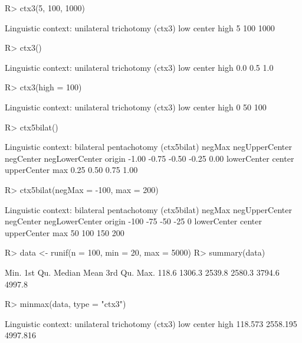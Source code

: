 \documentclass{article}\usepackage[]{graphicx}\usepackage[]{color}
\begin{document}
\begin{Schunk}
% --begin: "ctx"
\begin{Sinput}
R> ctx3(5, 100, 1000)
\end{Sinput}
\begin{Soutput}
Linguistic context: unilateral trichotomy (ctx3)
   low center   high 
     5    100   1000 
\end{Soutput}
\begin{Sinput}
R> ctx3()
\end{Sinput}
\begin{Soutput}
Linguistic context: unilateral trichotomy (ctx3)
   low center   high 
   0.0    0.5    1.0 
\end{Soutput}
\begin{Sinput}
R> ctx3(high = 100)
\end{Sinput}
\begin{Soutput}
Linguistic context: unilateral trichotomy (ctx3)
   low center   high 
     0     50    100 
\end{Soutput}
\begin{Sinput}
R> ctx5bilat()
\end{Sinput}
\begin{Soutput}
Linguistic context: bilateral pentachotomy (ctx5bilat)
        negMax negUpperCenter      negCenter negLowerCenter         origin 
         -1.00          -0.75          -0.50          -0.25           0.00 
   lowerCenter         center    upperCenter            max 
          0.25           0.50           0.75           1.00 
\end{Soutput}
\begin{Sinput}
R> ctx5bilat(negMax = -100, max = 200)
\end{Sinput}
\begin{Soutput}
Linguistic context: bilateral pentachotomy (ctx5bilat)
        negMax negUpperCenter      negCenter negLowerCenter         origin 
          -100            -75            -50            -25              0 
   lowerCenter         center    upperCenter            max 
            50            100            150            200 
\end{Soutput}
%
% --end: "ctx"
\end{Schunk}

\begin{Schunk}
% --begin: "minmax"
\begin{Sinput}
R> data <- runif(n = 100, min = 20, max = 5000)
R> summary(data)
\end{Sinput}
\begin{Soutput}
   Min. 1st Qu.  Median    Mean 3rd Qu.    Max. 
  118.6  1306.3  2539.8  2580.3  3794.6  4997.8 
\end{Soutput}
\begin{Sinput}
R> minmax(data, type = "ctx3")
\end{Sinput}
\begin{Soutput}
Linguistic context: unilateral trichotomy (ctx3)
     low   center     high 
 118.573 2558.195 4997.816 
\end{Soutput}
%
% --end: "minmax"
\end{Schunk}
\end{document}
